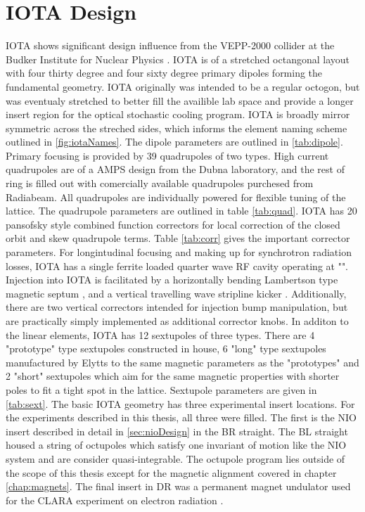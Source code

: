 \section{IOTA Design}
IOTA shows significant design influence from the VEPP-2000 collider at the Budker Institute for Nuclear Physics \cite{vepp-2000}. IOTA is of a stretched octangonal layout with four thirty degree and four sixty degree primary dipoles forming the fundamental geometry. IOTA originally was intended to be a regular octogon, but was eventualy stretched to better fill the availible lab space and provide a longer insert region for the optical stochastic cooling program. IOTA is broadly mirror symmetric across the streched sides, which informs the element naming scheme outlined in \ref{fig:iotaNames}. The dipole parameters are outlined in \ref{tab:dipole}. Primary focusing is provided by 39 quadrupoles of two types. High current quadrupoles are of a AMPS design from the Dubna laboratory, and the rest of ring is filled out with comercially available quadrupoles purchesed from Radiabeam. All quadrupoles are individually powered for flexible tuning of the lattice. The quadrupole parameters are outlined in table \ref{tab:quad}. IOTA has 20 pansofsky \cite{panofsky} style combined function correctors for local correction of the closed orbit and skew quadrupole terms. Table \ref{tab:corr} gives the important corrector parameters. For longintudinal focusing and making up for synchrotron radiation losses, IOTA has a single ferrite loaded quarter wave RF cavity operating at "". Injection into IOTA is facilitated by a horizontally bending Lambertson type magnetic septum \cite{lambertsonPatent}, and a vertical travelling wave stripline kicker \cite{antipovKicker}. Additionally, there are two vertical correctors intended for injection bump manipulation, but are practically simply implemented as additional corrector knobs. In additon to the linear elements, IOTA has 12 sextupoles of three types. There are 4 "prototype" type sextupoles constructed in house, 6 "long" type sextupoles manufactured by Elytts to the same magnetic parameters as the "prototypes" and 2 "short" sextupoles which aim for the same magnetic properties with shorter poles to fit a tight spot in the lattice. Sextupole parameters are given in \ref{tab:sext}. The basic IOTA geometry has three experimental insert locations. For the experiments described in this thesis, all three were filled. The first is the NIO insert described in detail in \ref{sec:nioDesign} in the BR straight. The BL straight housed a string of octupoles which satisfy one invariant of motion like the NIO system and are consider quasi-integrable. The octupole program lies outside of the scope of this thesis except for the magnetic alignment covered in chapter \ref{chap:magnets}. The final insert in DR was a permanent magnet undulator used for the CLARA experiment on electron radiation \cite{clara}. 

